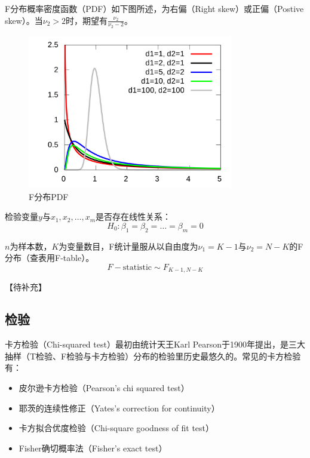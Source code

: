 \documentclass[11pt]{article}
\begin{document}
F分布概率密度函数（PDF）如下图所述，为右偏（Right skew）或正偏（Postive skew）。当$\nu_2>2$时，期望有$\frac{\nu_2}{\nu_2 -2}$。
\begin{figure}[ht!]
    \centering
    \includegraphics[width=0.8\textwidth]{fig/f-dist.png}
    \caption{F分布PDF}
    \label{fig:f-dist}
\end{figure}

检验变量$y$与$x_1,x_2,\dots,x_m$是否存在线性关系：
\begin{equation*}
    H_0: \beta_1 = \beta_2 = \dots = \beta_m = 0
\end{equation*}

$n$为样本数，$K$为变量数目，F统计量服从以自由度为$\nu_1=K-1$与$\nu_2=N-K$的F分布（查表用F-table）。
\begin{equation*}
    F-\text{statistic} \sim F_{K-1,N-K}
\end{equation*}

【待补充】

\subsection{检验}

卡方检验（Chi-squared test）最初由统计天王Karl Pearson于1900年提出，是三大抽样（T检验、F检验与卡方检验）分布的检验里历史最悠久的。常见的卡方检验有：
\begin{itemize}
    \item 皮尔逊卡方检验（Pearson's chi squared test）
    \item 耶茨的连续性修正（Yates's correction for continuity）
    \item 卡方拟合优度检验（Chi-square goodness of fit test）
    \item Fisher确切概率法（Fisher's exact test）
\end{itemize}
\end{document}
